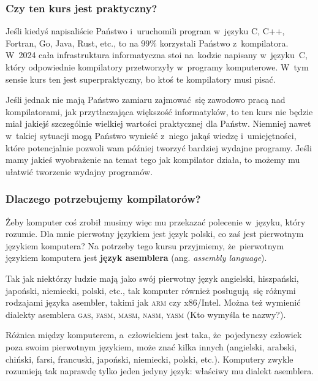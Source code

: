 \documentclass[10pt,t]{beamer}
\begin{document}
\begin{frame}
  \frametitle{Czy ten kurs jest praktyczny?}


  Jeśli kiedyś napisaliście Państwo i~uruchomili program w~języku C, C++,
  Fortran, Go, Java, Rust, etc., to na $99\%$ korzystali Państwo
  z~kompilatora. W~2024 cała infrastruktura informatyczna stoi
  na~kodzie napisany w~języku~C, który odpowiednie kompilatory przetworzyły
  w~programy komputerowe. W~tym sensie kurs ten jest superpraktyczny, bo
  ktoś te kompilatory musi pisać.

  Jeśli jednak nie mają Państwo zamiaru zajmować~się zawodowo pracą nad
  kompilatorami, jak przytłaczająca większość informatyków, to ten kurs nie
  będzie miał jakiejś szczególnie wielkiej wartości praktycznej dla Państw.
  Niemniej nawet w~takiej sytuacji mogą Państwo wynieść z~niego jakąś
  wiedzę i~umiejętności, które potencjalnie pozwoli wam później tworzyć
  bardziej wydajne programy. Jeśli mamy jakieś wyobrażenie na temat tego
  jak kompilator działa, to możemy mu ułatwić tworzenie wydajny programów.

\end{frame}





\begin{frame}
  \frametitle{Dlaczego potrzebujemy kompilatorów?}

  \pause


  Żeby komputer coś zrobił musimy więc mu przekazać polecenie w~języku,
  który rozumie. Dla mnie pierwotny językiem jest język polski, co zaś
  jest pierwotnym językiem komputera? Na potrzeby tego kursu przyjmiemy,
  że~pierwotnym językiem komputera jest \textbf{język asemblera}
  (ang. \textit{assembly language}).

  Tak jak niektórzy ludzie mają jako swój pierwotny język angielski,
  hiszpański, japoński, niemiecki, polski, etc., tak komputer również
  posługują~się różnymi rodzajami języka asembler, takimi jak \textsc{arm}
  czy x86/Intel. Można też wymienić dialekty asemblera \textsc{gas},
  \textsc{fasm}, \textsc{masm}, \textsc{nasm}, \textsc{yasm} (Kto wymyśla
  te nazwy?).

  Różnica między komputerem, a~człowiekiem jest taka, że~pojedynczy człowiek
  poza swoim pierwotnym językiem, może znać kilka innych (angielski,
  arabski, chiński, farsi, francuski, japoński, niemiecki, polski, etc.).
  Komputery zwykle rozumieją tak naprawdę tylko \alert{jeden jedyny}
  język: właściwy mu dialekt asemblera.

\end{frame}
\end{document}
